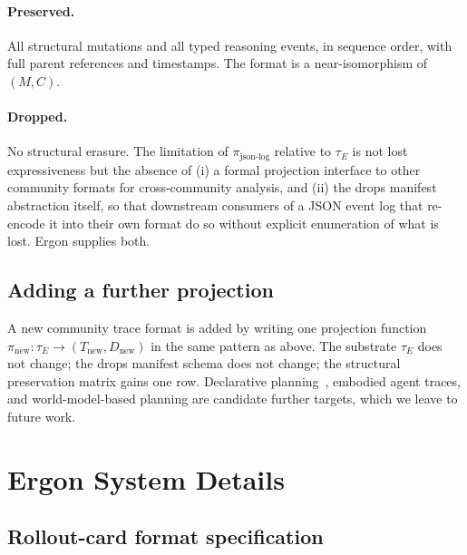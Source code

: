 \documentclass{article}
\begin{document}
\paragraph{Preserved.} All structural mutations and all typed
reasoning events, in sequence order, with full parent references
and timestamps. The format is a near-isomorphism of $(M, C)$.

\paragraph{Dropped.} No structural erasure. The limitation of
$\pi_{\text{json-log}}$ relative to $\tau_E$ is not lost
expressiveness but the absence of (i) a formal projection interface
to other community formats for cross-community analysis, and
(ii) the drops manifest abstraction itself, so that downstream
consumers of a JSON event log that re-encode it into their own
format do so without explicit enumeration of what is lost. Ergon
supplies both.

\subsection{Adding a further projection}
\label{app:proj:extension}

A new community trace format is added by writing one projection
function $\pi_{\text{new}}: \tau_E \to (T_{\text{new}}, D_{\text{new}})$
in the same pattern as above. The substrate $\tau_E$ does not
change; the drops manifest schema does not change; the structural
preservation matrix gains one row. Declarative
planning~\citep{ada2023llmp}, embodied agent traces, and
world-model-based planning are candidate further targets, which
we leave to future work.



\section{Ergon System Details}
\label{app:system}

\subsection{Rollout-card format specification}
\label{app:system:format-spec}
\end{document}
